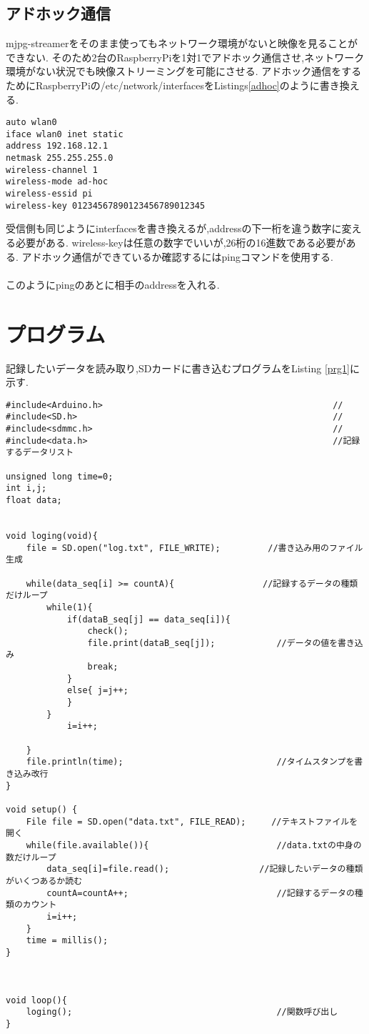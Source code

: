 \documentclass[12pt,oneside]{paper}
\begin{document}
\subsection{アドホック通信}
mjpg-streamerをそのまま使ってもネットワーク環境がないと映像を見ることができない.
そのため2台のRaspberryPiを1対1でアドホック通信させ,ネットワーク環境がない状況でも映像ストリーミングを可能にさせる.
アドホック通信をするためにRaspberryPiの/etc/network/interfacesをListings\ref{adhoc}のように書き換える.
\begin{lstlisting}[caption=interfaces,label=adhoc]
auto wlan0
iface wlan0 inet static 
address 192.168.12.1 
netmask 255.255.255.0 
wireless-channel 1 
wireless-mode ad-hoc 
wireless-essid pi 
wireless-key 01234567890123456789012345
\end{lstlisting}
受信側も同じようにinterfacesを書き換えるが,addressの下一桁を違う数字に変える必要がある.
wireless-keyは任意の数字でいいが,26桁の16進数である必要がある.
アドホック通信ができているか確認するにはpingコマンドを使用する.\\
\\
このようにpingのあとに相手のaddressを入れる.

\section{プログラム}

記録したいデータを読み取り,SDカードに書き込むプログラムをListing \ref{prg1}に示す.
\begin{lstlisting}[caption=ログProgram,label=prg1]
#include<Arduino.h>                                             //
#include<SD.h>                                                  //
#include<sdmmc.h>                                               //
#include<data.h>                                                //記録するデータリスト

unsigned long time=0;
int i,j;
float data;


void loging(void){
	file = SD.open("log.txt", FILE_WRITE);　　　　　 //書き込み用のファイル生成
	
	while(data_seq[i] >= countA){   　　　　　　　　 //記録するデータの種類だけループ
		while(1){
			if(dataB_seq[j] == data_seq[i]){
				check();
				file.print(dataB_seq[j]);            //データの値を書き込み
				break;
			}
			else{ j=j++;
			}
		}
			i=i++;

	}
	file.println(time);                              //タイムスタンプを書き込み改行
}

void setup() {
	File file = SD.open("data.txt", FILE_READ);　　　//テキストファイルを開く
	while(file.available()){                         //data.txtの中身の数だけループ
		data_seq[i]=file.read();　　　　　　　　　　 //記録したいデータの種類がいくつあるか読む
		countA=countA++;                             //記録するデータの種類のカウント
		i=i++;　　　　　　　　　　　　　　　　　　　
	}	
	time = millis();                                        
}



void loop(){
	loging();                                        //関数呼び出し
}


\end{lstlisting}
\end{document}
